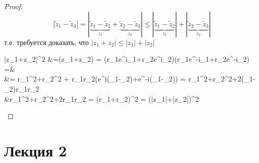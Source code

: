 	\begin{proof}
		 \[ |\tilde z_1-\tilde z_3| = |\underbrace{\tilde z_1 - \tilde z_2}_{z_1}+ \underbrace{\tilde z_2 - \tilde z_3}_{z_2}| \leqslant |\underbrace{\tilde z_1-\tilde z_2}_{z_1}|+|\underbrace{\tilde z_2-\tilde z_3}_{z_2}|\]
		 $\text{т.е. требуется доказать, что } |z_1+z_2 | \leqslant |z_1|+|z_2|$
		\begin{flalign*}
			|z_1+z_2|^2 &=(z_1+z_2) = (r_1e^{i\phi_1}+r_2e^{i\phi_2})(r_1e^{-i\phi_1}+r_2e^{-i\phi_2}) =&\\
			&= r_1^2+r_2^2 + r_1r_2(e^{i(\phi_1-\phi_2)}+e^{-i(\phi_1-\phi_2)}) = r_1^2+r_2^2+2\cos(\phi_1-\phi_2)r_1r_2 \leqslant \\
			&\leqslant r_1^2+r_2^2+2r_1r_2 = (r_1+r_2)^2 = (|z_1|+|z_2|)^2
		\end{flalign*}
	\end{proof}
	\newpage
	\section{Лекция 2}
